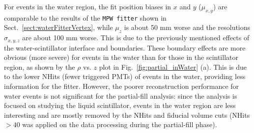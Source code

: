 For events in the water region, the fit position biases in $x$ and $y$ ($\mu_{x,y}$) are comparable to the results of the \texttt{MPW fitter} shown in Sect.~\ref{sect:waterFitterVertex}, while $\mu_z$ is about 50 mm worse and the resolutions $\sigma_{x,y,z}$ are about 100 mm worse. This is due to the previously mentioned effects of the water-scintillator interface and boundaries. These boundary effects are more obvious (more severe) for events in the water than for those in the scintillator region, as shown by the $\rho$ vs. $z$ plot in Fig.~\ref{fig:partial_inWater} (a). This is due to the lower NHits (fewer triggered PMTs) of events in the water, providing less information for the fitter. However, the poorer reconstruction performance for water events is not significant for the partial-fill analysis: since the analysis is focused on studying the liquid scintillator, events in the water region are less interesting and are mostly removed by the NHits and fiducial volume cuts (NHits$>40$ was applied on the data processing during the partial-fill phase). 


